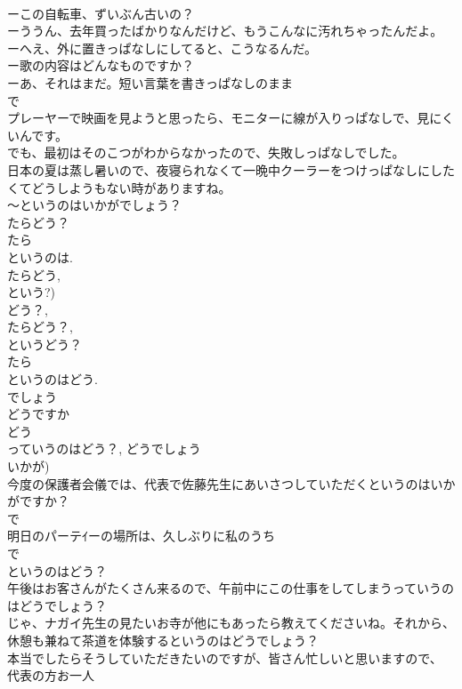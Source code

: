 \documentclass[8pt]{extreport}
\begin{document}
\begin{CJK}{UTF8}{min}
\\	ーこの自転車、ずいぶん古いの？
\\	ーううん、去年買ったばかりなんだけど、もうこんなに汚れちゃったんだよ。
\\	ーへえ、外に置きっぱなしにしてると、こうなるんだ。
\\	ー歌の内容はどんなものですか？
\\	ーあ、それはまだ。短い言葉を書きっぱなしのまま
\\	で
\\	プレーヤーで映画を見ようと思ったら、モニターに線が入りっぱなしで、見にくいんです。
\\	でも、最初はそのこつがわからなかったので、失敗しっぱなしでした。 
\\	日本の夏は蒸し暑いので、夜寝られなくて一晩中クーラーをつけっぱなしにしたくてどうしようもない時がありますね。
\\	～というのはいかがでしょう？
\\	たらどう？ 
\\	たら 
\\	というのは. 
\\	たらどう, 
\\	という?) 
\\	どう？, 
\\	たらどう？, 
\\	というどう？ 
\\	たら 
\\	というのはどう.
\\	でしょう 
\\	どうですか 
\\	どう 
\\	っていうのはどう？, どうでしょう 
\\	いかが)
\\	今度の保護者会儀では、代表で佐藤先生にあいさつしていただくというのはいかがですか？
\\	で 
\\	明日のパーテｲーの場所は、久しぶりに私のうち
\\	で
\\	というのはどう？
\\	午後はお客さんがたくさん来るので、午前中にこの仕事をしてしまうっていうのはどうでしょう？
\\	じゃ、ナガイ先生の見たいお寺が他にもあったら教えてくださいね。それから、休憩も兼ねて茶道を体験するというのはどうでしょう？
\\	本当でしたらそうしていただきたいのですが、皆さん忙しいと思いますので、
\\	代表の方お一人

\end{CJK}
\end{document}
